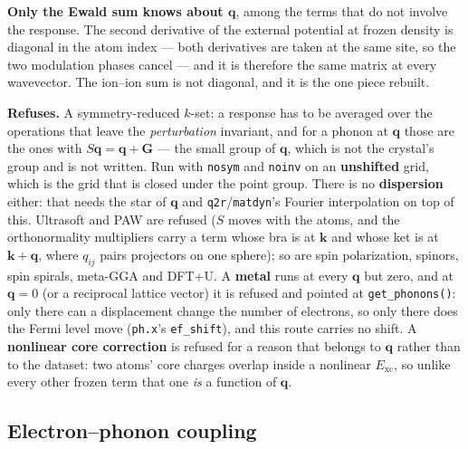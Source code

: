 \documentclass[11pt,a4paper]{article}
\newcommand{\code}[1]{\texttt{\small #1}}
\begin{document}
\textbf{Only the Ewald sum knows about $\mathbf q$}, among the terms that do not
involve the response. The second derivative of the external potential at frozen
density is diagonal in the atom index --- both derivatives are taken at the same
site, so the two modulation phases cancel --- and it is therefore the same
matrix at every wavevector. The ion--ion sum is not diagonal, and it is the one
piece rebuilt.

\begin{refuses}
\textbf{Refuses.} A symmetry-reduced $k$-set: a response has to be averaged over
the operations that leave the \emph{perturbation} invariant, and for a phonon at
$\mathbf q$ those are the ones with $S\mathbf q = \mathbf q + \mathbf G$ --- the
small group of $\mathbf q$, which is not the crystal's group and is not written.
Run with \code{nosym} and \code{noinv} on an \textbf{unshifted} grid, which is
the grid that is closed under the point group. There is no \textbf{dispersion}
either: that needs the star of $\mathbf q$ and \code{q2r}/\code{matdyn}'s
Fourier interpolation on top of this. Ultrasoft and PAW are refused ($S$ moves
with the atoms, and the orthonormality multipliers carry a term whose bra is at
$\mathbf k$ and whose ket is at $\mathbf k+\mathbf q$, where $q_{ij}$ pairs
projectors on one sphere); so are spin polarization, spinors, spin
spirals, meta-GGA and DFT+U. A \textbf{metal} runs at every $\mathbf q$ but
zero, and at $\mathbf q = 0$ (or a reciprocal lattice vector) it is refused
and pointed at \code{get\_phonons()}: only there can a displacement change the
number of electrons, so only there does the Fermi level move (\code{ph.x}'s
\code{ef\_shift}), and this route carries no shift. A \textbf{nonlinear core correction} is refused for
a reason that belongs to $\mathbf q$ rather than to the dataset: two atoms' core
charges overlap inside a nonlinear $E_{\mathrm{xc}}$, so unlike every other
frozen term that one \emph{is} a function of $\mathbf q$.
\end{refuses}

\subsection*{Electron--phonon coupling}
\end{document}
